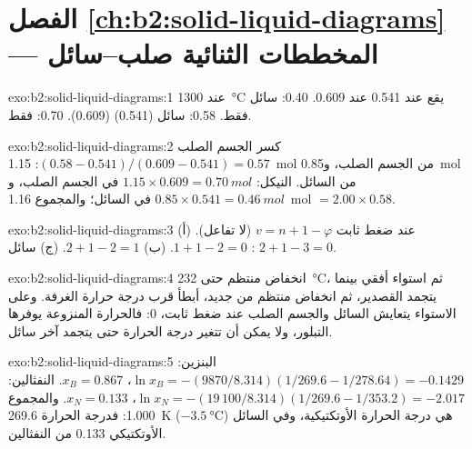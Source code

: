 \section*{الفصل \ref{ch:b2:solid-liquid-diagrams} --- المخططات الثنائية صلب--سائل}

\begin{solution}{exo:b2:solid-liquid-diagrams:1}
عند \qty{1300}{\degreeCelsius} يقع  عند 0.541  عند 0.609.
0.40: سائل فقط. 0.58: سائل (0.541)  (0.609). 0.70:
 فقط.
\end{solution}

\begin{solution}{exo:b2:solid-liquid-diagrams:2}
كسر الجسم الصلب $(0.58 - 0.541)/(0.609 - 0.541) = 0.57$: \qty{1.15}{mol} من الجسم الصلب،
و\qty{0.85}{mol} من السائل. النيكل: $1.15 \times 0.609 = \qty{0.70}{mol}$ في
الجسم الصلب، و$0.85 \times 0.541 = \qty{0.46}{mol}$ في السائل؛ والمجموع \qty{1.16}{mol}
$= 2.00 \times 0.58$.
\end{solution}

\begin{solution}{exo:b2:solid-liquid-diagrams:3}
عند ضغط ثابت $v = n + 1 - \varphi$ (لا تفاعل). (أ) $1 + 1 - 2 = 0$.
(ب) $2 + 1 - 2 = 1$. (ج) سائل : $2 + 1 - 3 = 0$.
\end{solution}

\begin{solution}{exo:b2:solid-liquid-diagrams:4}
انخفاض منتظم حتى \qty{232}{\degreeCelsius}، ثم استواء أفقي بينما يتجمد
القصدير، ثم انخفاض منتظم من جديد، أبطأ قرب درجة حرارة الغرفة. وعلى
الاستواء يتعايش السائل والجسم الصلب عند ضغط ثابت،  0: فالحرارة
المنزوعة يوفرها التبلور، ولا يمكن أن تتغير درجة الحرارة
حتى يتجمد آخر سائل.
\end{solution}

\begin{solution}{exo:b2:solid-liquid-diagrams:5}
البنزين: $\ln x_B = -(9870/8.314)(1/269.6 - 1/278.64) = -0.1429$، $x_B =
0.867$. النفثالين: $\ln x_N = -(19\,100/8.314)(1/269.6 - 1/353.2) = -2.017$،
$x_N = 0.133$. والمجموع 1.000: فدرجة الحرارة \qty{269.6}{K} ($\qty{-3.5}{\degreeCelsius}$) هي
درجة الحرارة الأوتكتيكية، وفي السائل الأوتكتيكي 0.133 من النفثالين.
\end{solution}

